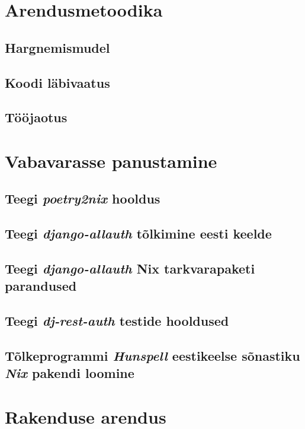 \section{Arendusmetoodika}

\subsection{Hargnemismudel}

\subsection{Koodi läbivaatus}

\subsection{Tööjaotus}


\section{Vabavarasse panustamine}

\subsection{Teegi \textit{poetry2nix} hooldus}

\subsection{Teegi \textit{django-allauth} tõlkimine eesti keelde}

\subsection{Teegi \textit{django-allauth} Nix tarkvarapaketi parandused}

\subsection{Teegi \textit{dj-rest-auth} testide hooldused}

\subsection{Tõlkeprogrammi \textit{Hunspell} eestikeelse sõnastiku \textit{Nix} pakendi loomine}


\section{Rakenduse arendus}

